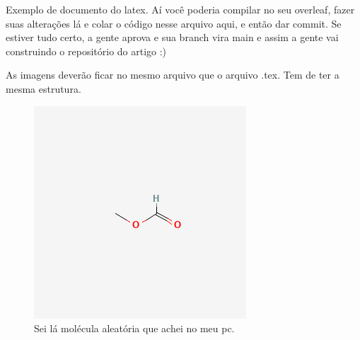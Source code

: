 \documentclass[a4paper,12pt]{article}
\begin{document}
Exemplo de documento do latex. 
Aí você poderia compilar no seu overleaf, fazer suas alterações lá e colar o código nesse arquivo aqui, e então dar commit. 
Se estiver tudo certo, a gente aprova e sua branch vira main e assim a gente vai construindo o repositório do artigo :)

As imagens deverão ficar no mesmo arquivo que o arquivo .tex. Tem de ter a mesma estrutura.

\begin{figure}
    \centering
    \includegraphics[width=1\linewidth]{imagens/molécula.png}
    \caption{Sei lá molécula aleatória que achei no meu pc.}
    \label{fig:mol}
\end{figure}
\end{document}
